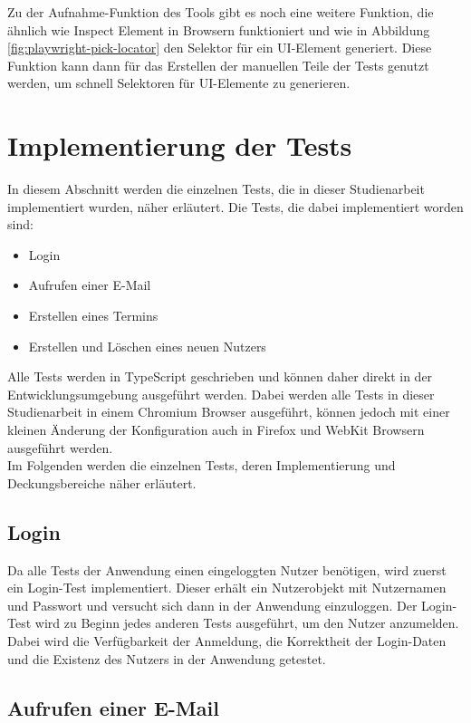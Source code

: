 Zu der Aufnahme-Funktion des Tools gibt es noch eine weitere Funktion, die ähnlich wie Inspect Element in Browsern funktioniert und wie in Abbildung \ref{fig:playwright-pick-locator} den Selektor für ein UI-Element generiert.
Diese Funktion kann dann für das Erstellen der manuellen Teile der Tests genutzt werden, um schnell Selektoren für UI-Elemente zu generieren.



\section{Implementierung der Tests}

In diesem Abschnitt werden die einzelnen Tests, die in dieser Studienarbeit implementiert wurden, näher erläutert.
Die Tests, die dabei implementiert worden sind:
\begin{itemize}
    \item Login
    \item Aufrufen einer E-Mail
    \item Erstellen eines Termins
    \item Erstellen und Löschen eines neuen Nutzers
\end{itemize}
Alle Tests werden in TypeScript geschrieben und können daher direkt in der Entwicklungsumgebung ausgeführt werden.
Dabei werden alle Tests in dieser Studienarbeit in einem Chromium Browser ausgeführt, können jedoch mit einer kleinen Änderung der Konfiguration auch in Firefox und WebKit Browsern ausgeführt werden.
\\
Im Folgenden werden die einzelnen Tests, deren Implementierung und Deckungsbereiche näher erläutert.

\subsection*{Login}

Da alle Tests der Anwendung einen eingeloggten Nutzer benötigen, wird zuerst ein Login-Test implementiert. Dieser erhält ein Nutzerobjekt mit Nutzernamen und Passwort und versucht sich dann in der Anwendung einzuloggen.
Der Login-Test wird zu Beginn jedes anderen Tests ausgeführt, um den Nutzer anzumelden.
Dabei wird die Verfügbarkeit der Anmeldung, die Korrektheit der Login-Daten und die Existenz des Nutzers in der Anwendung getestet.

\subsection*{Aufrufen einer E-Mail}

